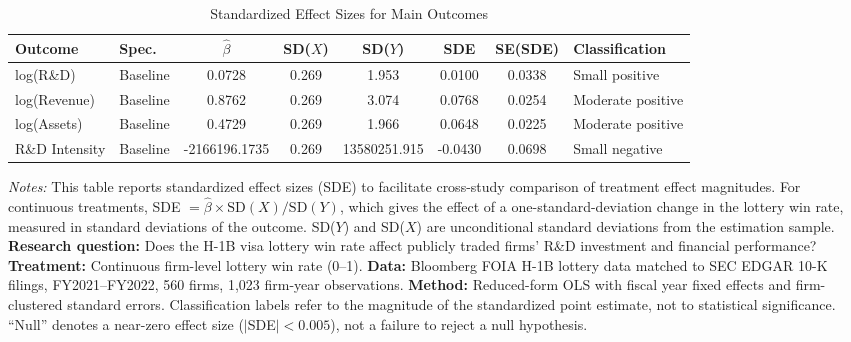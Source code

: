 \begin{table}[H]
\centering
\caption{Standardized Effect Sizes for Main Outcomes}
\label{tab:sde}
\small
\begin{adjustbox}{max width=\textwidth}
\begin{tabular}{llcccccl}
\toprule
Outcome & Spec. & $\hat{\beta}$ & SD($X$) & SD($Y$) & SDE & SE(SDE) & Classification \\
\midrule
log(R\&D) & Baseline & 0.0728 & 0.269 & 1.953 & 0.0100 & 0.0338 & Small positive \\
log(Revenue) & Baseline & 0.8762 & 0.269 & 3.074 & 0.0768 & 0.0254 & Moderate positive \\
log(Assets) & Baseline & 0.4729 & 0.269 & 1.966 & 0.0648 & 0.0225 & Moderate positive \\
R\&D Intensity & Baseline & -2166196.1735 & 0.269 & 13580251.915 & -0.0430 & 0.0698 & Small negative \\
\bottomrule
\end{tabular}
\end{adjustbox}
\par\vspace{0.3em}
{\footnotesize \emph{Notes:} This table reports standardized effect sizes (SDE) to facilitate cross-study comparison of treatment effect magnitudes. For continuous treatments, SDE $= \hat{\beta} \times \text{SD}(X) / \text{SD}(Y)$, which gives the effect of a one-standard-deviation change in the lottery win rate, measured in standard deviations of the outcome. SD($Y$) and SD($X$) are unconditional standard deviations from the estimation sample. \textbf{Research question:} Does the H-1B visa lottery win rate affect publicly traded firms' R\&D investment and financial performance? \textbf{Treatment:} Continuous firm-level lottery win rate (0--1). \textbf{Data:} Bloomberg FOIA H-1B lottery data matched to SEC EDGAR 10-K filings, FY2021--FY2022, 560 firms, 1,023 firm-year observations. \textbf{Method:} Reduced-form OLS with fiscal year fixed effects and firm-clustered standard errors. Classification labels refer to the magnitude of the standardized point estimate, not to statistical significance. ``Null'' denotes a near-zero effect size ($|$SDE$| < 0.005$), not a failure to reject a null hypothesis.}
\end{table}
